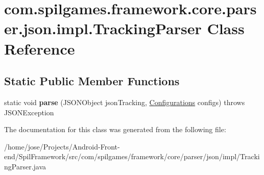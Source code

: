 \hypertarget{classcom_1_1spilgames_1_1framework_1_1core_1_1parser_1_1json_1_1impl_1_1_tracking_parser}{\section{com.\-spilgames.\-framework.\-core.\-parser.\-json.\-impl.\-Tracking\-Parser Class Reference}
\label{classcom_1_1spilgames_1_1framework_1_1core_1_1parser_1_1json_1_1impl_1_1_tracking_parser}
}
\subsection*{Static Public Member Functions}
\begin{DoxyCompactItemize}
\item 
\hypertarget{classcom_1_1spilgames_1_1framework_1_1core_1_1parser_1_1json_1_1impl_1_1_tracking_parser_ad74f4af5e0a6fb0faae82e4ec8ca6f56}{static void {\bfseries parse} (J\-S\-O\-N\-Object json\-Tracking, \hyperlink{classcom_1_1spilgames_1_1framework_1_1data_1_1_configurations}{Configurations} configs)  throws J\-S\-O\-N\-Exception }\label{classcom_1_1spilgames_1_1framework_1_1core_1_1parser_1_1json_1_1impl_1_1_tracking_parser_ad74f4af5e0a6fb0faae82e4ec8ca6f56}

\end{DoxyCompactItemize}


The documentation for this class was generated from the following file\-:\begin{DoxyCompactItemize}
\item 
/home/jose/\-Projects/\-Android-\/\-Front-\/end/\-Spil\-Framework/src/com/spilgames/framework/core/parser/json/impl/Tracking\-Parser.\-java\end{DoxyCompactItemize}
